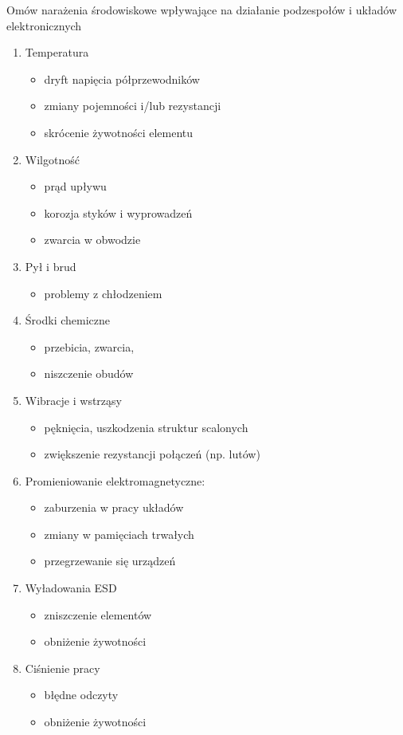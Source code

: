 \newpage
\task
Omów narażenia środowiskowe wpływające na działanie podzespołów i układów
elektronicznych
\begin{enumerate}
    \item Temperatura
    \begin{itemize}
        \item dryft napięcia półprzewodników
        \item zmiany pojemności i/lub rezystancji
        \item skrócenie żywotności elementu
    \end{itemize}
    \item Wilgotność
    \begin{itemize}
        \item prąd upływu
        \item korozja styków i wyprowadzeń
        \item zwarcia w obwodzie
    \end{itemize}
    \item Pył i brud
    \begin{itemize}
        \item problemy z chłodzeniem
    \end{itemize}
    \item Środki chemiczne
    \begin{itemize}
        \item przebicia, zwarcia,
        \item niszczenie obudów
    \end{itemize}
    \item Wibracje i wstrząsy
    \begin{itemize}
        \item pęknięcia, uszkodzenia struktur scalonych
        \item zwiększenie rezystancji połączeń (np. lutów)
    \end{itemize}
    \item Promieniowanie elektromagnetyczne:
    \begin{itemize}
        \item zaburzenia w pracy układów
        \item zmiany w pamięciach trwałych
        \item przegrzewanie się urządzeń
    \end{itemize}
    \item Wyładowania ESD
    \begin{itemize}
        \item zniszczenie elementów
        \item obniżenie żywotności
    \end{itemize}
    \item Ciśnienie pracy
    \begin{itemize}
        \item błędne odczyty
        \item obniżenie żywotności
    \end{itemize}
\end{enumerate}
\newpage

